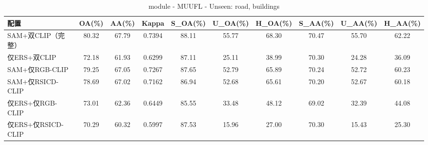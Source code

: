 \begin{table}[htbp]
\centering
\caption{module - MUUFL - Unseen: road, buildings}
\begin{tabular}{lccccccccc}
\hline
配置 & OA(\%) & AA(\%) & Kappa & S\_OA(\%) & U\_OA(\%) & H\_OA(\%) & S\_AA(\%) & U\_AA(\%) & H\_AA(\%) \\
\hline
SAM+双CLIP（完整） & 80.32 & 67.79 & 0.7394 & 88.11 & 55.77 & 68.30 & 70.47 & 55.70 & 62.22 \\
仅ERS+双CLIP & 72.18 & 61.93 & 0.6299 & 87.11 & 25.11 & 38.99 & 70.30 & 24.28 & 36.09 \\
SAM+仅RGB-CLIP & 79.25 & 67.05 & 0.7267 & 87.65 & 52.79 & 65.89 & 70.24 & 52.72 & 60.23 \\
SAM+仅RSICD-CLIP & 78.69 & 67.02 & 0.7162 & 86.94 & 52.68 & 65.61 & 70.20 & 52.67 & 60.18 \\
仅ERS+仅RGB-CLIP & 73.01 & 62.36 & 0.6449 & 85.55 & 33.48 & 48.12 & 69.02 & 32.39 & 44.08 \\
仅ERS+仅RSICD-CLIP & 70.29 & 60.32 & 0.5997 & 87.53 & 15.96 & 27.00 & 70.30 & 15.43 & 25.30 \\
\hline
\end{tabular}
\end{table}